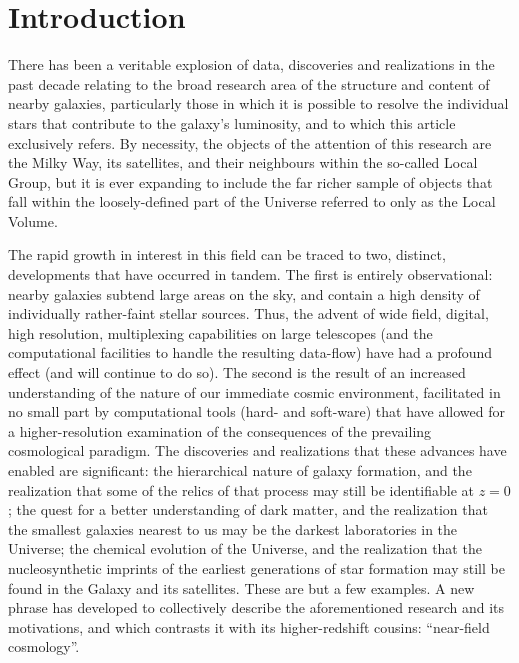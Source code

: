 \documentclass[manuscript]{aastex}
\begin{document}

\clearpage

\newpage

\section{Introduction}

There has been a veritable explosion of data, discoveries and
realizations in the past decade relating to the broad
research area of the structure and content of nearby galaxies,
particularly those in which it is possible to resolve the individual
stars that contribute to the galaxy's luminosity, and to which this
article exclusively refers. By necessity, the objects of the attention
of this research are the Milky Way, its satellites, and their
neighbours within the so-called Local Group, but it is ever expanding
to include the far richer sample of objects that fall within the
loosely-defined part of the Universe referred to only as the Local
Volume.

The rapid growth in interest in this field can be traced to two,
distinct, developments that have occurred in tandem. The first is
entirely observational: nearby galaxies subtend large areas on the
sky, and contain a high density of individually rather-faint stellar
sources. Thus, the advent of wide field, digital, high resolution,
multiplexing capabilities on large telescopes (and the computational
facilities to handle the resulting data-flow) have had a profound
effect (and will continue to do so). The second is the result of an
increased understanding of the nature of our immediate cosmic
environment, facilitated in no small part by computational tools
(hard- and soft-ware) that have allowed for a higher-resolution
examination of the consequences of the prevailing cosmological
paradigm. The discoveries and realizations that these advances have
enabled are significant: the hierarchical nature of galaxy
formation, and the realization that some of the relics of that process
may still be identifiable at $z = 0$; the quest for a better
understanding of dark matter, and the realization that the smallest
galaxies nearest to us may be the darkest laboratories in the
Universe; the chemical evolution of the Universe, and the realization
that the nucleosynthetic imprints of the earliest generations of star
formation may still be found in the Galaxy and its satellites. These
are but a few examples. A new phrase has developed to collectively
describe the aforementioned research and its motivations, and which
contrasts it with its higher-redshift cousins: ``near-field
cosmology''.
\end{document}
